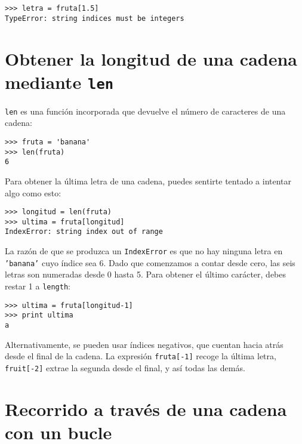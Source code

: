 
\beforeverb
\begin{verbatim}
>>> letra = fruta[1.5]
TypeError: string indices must be integers
\end{verbatim}
\afterverb
%

\section{Obtener la longitud de una cadena mediante {\tt len}}


{\tt len} es una función incorporada que devuelve el número de caracteres
de una cadena:

\beforeverb
\begin{verbatim}
>>> fruta = 'banana'
>>> len(fruta)
6
\end{verbatim}
\afterverb
%
Para obtener la última letra de una cadena, puedes sentirte tentado a intentar
algo como esto:


\beforeverb
\begin{verbatim}
>>> longitud = len(fruta)
>>> ultima = fruta[longitud]
IndexError: string index out of range
\end{verbatim}
\afterverb
%
La razón de que se produzca un {\tt IndexError} es que no hay ninguna letra
en {\tt 'banana'} cuyo índice sea 6. Dado que comenzamos a contar desde cero, las
seis letras son numeradas desde 0 hasta 5. Para obtener el último carácter, debes
restar 1 a {\tt length}:

\beforeverb
\begin{verbatim}
>>> ultima = fruta[longitud-1]
>>> print ultima
a
\end{verbatim}
\afterverb
%
Alternativamente, se pueden usar índices negativos, que cuentan hacia atrás desde
el final de la cadena. La expresión {\tt fruta[-1]} recoge la última
letra, {\tt fruit[-2]} extrae la segunda desde el final, y así todas las demás.



\section{Recorrido a través de una cadena con un bucle}
\label{for}


